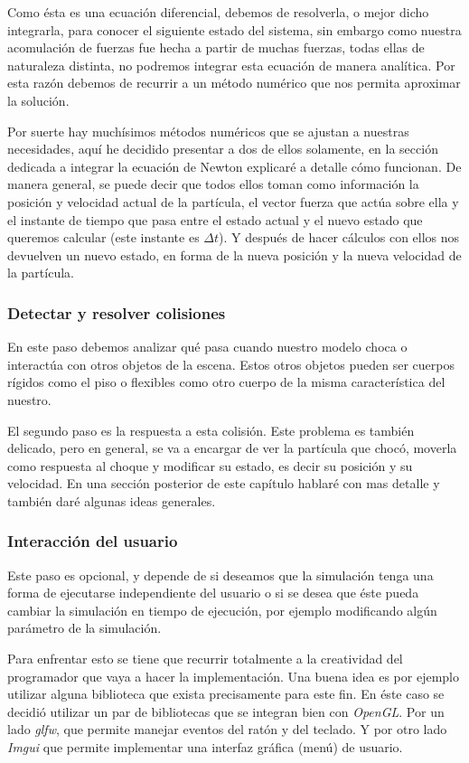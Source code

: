 Como ésta es una ecuación diferencial, debemos de resolverla, o mejor dicho integrarla, para conocer el siguiente estado del sistema, sin embargo como nuestra acomulación de fuerzas fue hecha a partir de muchas fuerzas, todas ellas de naturaleza distinta, no podremos integrar esta ecuación de manera analítica.
Por esta razón debemos de recurrir a un método numérico que nos permita aproximar la solución.

Por suerte hay muchísimos métodos numéricos que se ajustan a nuestras necesidades, aquí he decidido presentar a dos de ellos solamente, en la sección dedicada a integrar la ecuación de Newton explicaré a detalle cómo funcionan.
De manera general, se puede decir que todos ellos toman como información la posición y velocidad actual de la partícula, el vector fuerza que actúa sobre ella y el instante de tiempo que pasa entre el estado actual y el nuevo estado que queremos calcular (este instante es $\Delta t$).
Y después de hacer cálculos con ellos nos devuelven un nuevo estado, en forma de la nueva posición y la nueva velocidad de la partícula.

\subsubsection{Detectar y resolver colisiones}
En este paso debemos analizar qué pasa cuando nuestro modelo choca o interactúa con otros objetos de la escena.
Estos otros objetos pueden ser cuerpos rígidos como el piso o flexibles como otro cuerpo de la misma característica del nuestro.

El segundo paso es la respuesta a esta colisión.
Este problema es también delicado, pero en general, se va a encargar de ver la partícula que chocó, moverla como respuesta al choque y modificar su estado, es decir su posición y su velocidad.
En una sección posterior de este capítulo hablaré con mas detalle y también daré algunas ideas generales.

\subsubsection{Interacción del usuario}
Este paso es opcional, y depende de si deseamos que la simulación tenga una forma de ejecutarse independiente del usuario o si se desea que éste pueda cambiar la simulación en tiempo de ejecución, por ejemplo modificando algún parámetro de la simulación.

Para enfrentar esto se tiene que recurrir totalmente a la creatividad del programador que vaya a hacer la implementación.
Una buena idea es por ejemplo utilizar alguna biblioteca que exista precisamente para este fin. En éste caso se decidió utilizar un par de bibliotecas que se integran bien con \emph{\foreignlanguage{english}{OpenGL}}.
Por un lado \emph{\foreignlanguage{english}{glfw}}, que permite manejar eventos del ratón y del teclado. 
Y por otro lado \emph{\foreignlanguage{english}{Imgui}} que permite implementar una interfaz gráfica (menú) de usuario.

